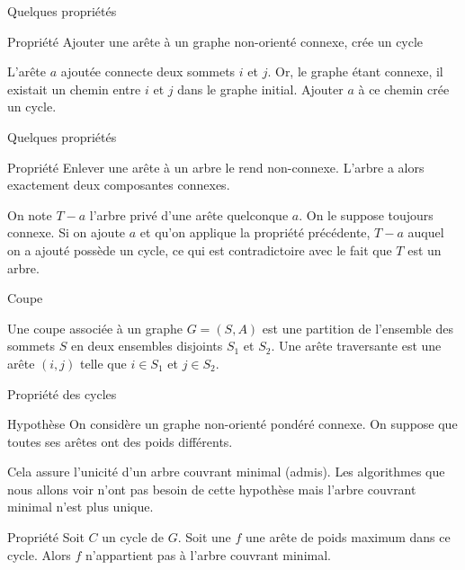 \begin{frame}{Quelques propriétés}
    \begin{block}{Propriété}
        Ajouter une arête à un graphe non-orienté connexe, crée un cycle
    \end{block}
    L'arête $a$ ajoutée connecte deux sommets $i$ et $j$. Or, le graphe étant connexe, il existait un chemin entre $i$ et $j$ dans le graphe initial. Ajouter $a$ à ce chemin crée un cycle.  
\end{frame}

\begin{frame}{Quelques propriétés}
    \begin{block}{Propriété}
        Enlever une arête à un arbre le rend non-connexe. L'arbre a alors exactement deux composantes connexes. 
    \end{block}
    On note $T-a$ l'arbre privé d'une arête quelconque $a$. On le suppose toujours connexe. Si on ajoute $a$ et qu'on applique la propriété précédente, $T-a$ auquel on a ajouté possède un cycle, ce qui est contradictoire avec le fait que $T$ est un arbre. 
\end{frame}

\begin{frame}{Coupe}
    \begin{definition}
        Une coupe associée à un graphe $G=(S,A)$ est une partition de l'ensemble des sommets $S$ en deux ensembles disjoints $S_1$ et $S_2$. Une arête traversante est une arête $(i,j)$ telle que $i \in S_1$ et $j \in S_2$. 
    \end{definition}
\end{frame}

\begin{frame}{Propriété des cycles}

    \begin{block}{Hypothèse}
        On considère un graphe non-orienté pondéré connexe. On suppose que toutes ses arêtes ont des poids différents.
    \end{block}

    Cela assure l'unicité d'un arbre couvrant minimal (admis). Les algorithmes que nous allons voir n'ont pas besoin de cette hypothèse mais l'arbre couvrant minimal n'est plus unique. 
    
    \begin{block}{Propriété}
        Soit $C$ un cycle de $G$. Soit une $f$ une arête de poids maximum dans ce cycle. Alors $f$ n'appartient pas à l'arbre couvrant minimal.
    \end{block}

\end{frame}

